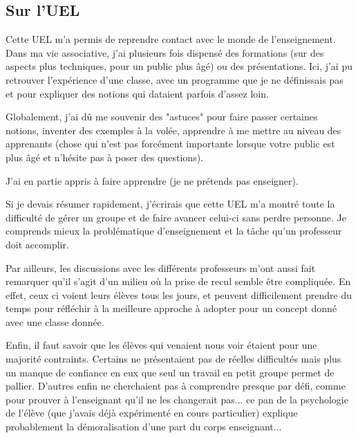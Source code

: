 \subsection{Sur l'UEL}

Cette UEL m'a permis de reprendre contact avec le monde de l'enseignement. Dans ma vie associative, j'ai plusieurs fois
dispensé des formations (sur des aspects plus techniques, pour un public plus âgé) ou des présentations. Ici, j'ai pu
retrouver l'expérience d'une classe, avec un programme que je ne définissais pas et pour expliquer des notions qui dataient
parfois d'assez loin.

Globalement, j'ai dû me souvenir des "astuces" pour faire passer certaines notions, inventer des exemples à la volée,
apprendre à me mettre au niveau des apprenants (chose qui n'est pas forcément importante lorsque votre public est plus
âgé et n'hésite pas à poser des questions).

J'ai en partie appris à faire apprendre (je ne prétends pas enseigner).

Si je devais résumer rapidement, j'écrirais que cette UEL m'a montré toute la difficulté de gérer un groupe et de faire
avancer celui-ci sans perdre personne. Je comprends mieux la problématique d'enseignement et la tâche qu'un professeur
doit accomplir.

Par ailleurs, les discussions avec les différents professeurs m'ont aussi fait remarquer qu'il s'agit d'un milieu où la
prise de recul semble être compliquée. En effet, ceux ci voient leurs élèves tous les jours, et peuvent difficilement
prendre du temps pour réfléchir à la meilleure approche à adopter pour un concept donné avec une classe donnée.

Enfin, il faut savoir que les élèves qui venaient nous voir étaient pour une majorité contraints. Certains ne
présentaient pas de réelles difficultés mais plus un manque de confiance en eux que seul un travail en petit groupe permet de
pallier. D'autres enfin ne cherchaient pas à comprendre presque par défi, comme pour prouver à l'enseignant qu'il ne les
changerait pas... ce pan de la psychologie de l'élève (que j'avais déjà expérimenté en cours particulier) explique
probablement la démoralisation d'une part du corps enseignant...
